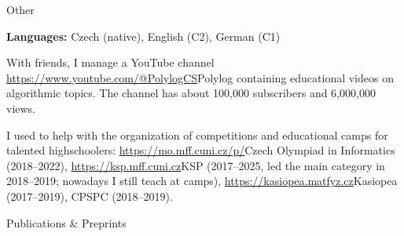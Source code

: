  \iffalse
\sekce Skills
 
{\bf Programming languages:} {\af advanced:} {\B Python}, {\B \Cpp}, {\B C}, {\B sh}; {\af intermediate:} {\B Rust}; {\af basic:} \Cis{}, Haskell.

\smallskip

{\bf Technologies:} {\af Git}, {\af NumPy}, {\af PyTorch}, {\af TensorFlow},
{\af Pandas}, {\af GoogleTest}, {\af GDB}, {\af Make}. Long-time ($> 10$ years) Linux user
with sysadmin and {\bf systems programming} experience.

\smallskip

I also try to broaden my scope by taking {\bf courses in related areas}. So
far, I have taken, for example: Computer Linguistics, Deep Learning, Computer Graphics, Data
Compression Algorithms, Reliable and Trustworthy AI, Information Theory,
Principles of Distributed Computing.

\smallskip


{\bf Languages}: Czech (native), English (C2 -- CAE Grade A), German (B2–C1), French (basics)

\fi

\iffalse
\sekce Teaching

\itemindent=.5\itemindent
\itemnarrow=0pt
\list{-}
	\: Programming I/II practicals for advanced students (), co-taught with Martin Mareš
	\: Programming I practicals for advanced students (), co-taught with Martin Mareš
\endlist

\fi

\sekce Other

{\bf Languages:} Czech (native), English (C2), German (C1)%

With friends, I manage a YouTube channel \url{https://www.youtube.com/@PolylogCS}{Polylog} containing educational videos on algorithmic topics. The channel has about 100,000 subscribers and 6,000,000 views.

I used to help with the organization of competitions and educational camps for talented highschoolers: \url{https://mo.mff.cuni.cz/p/}{Czech Olympiad in Informatics} (2018--2022), \url{https://ksp.mff.cuni.cz}{KSP} (2017–2025, led the main category in 2018–2019; nowadays I still teach at camps), \url{https://kasiopea.matfyz.cz}{Kasiopea} (2017--2019), CPSPC (2018--2019).

%
%

\sekce Publications \& Preprints

\unskip
\nocite{smooth-sensitivity}%
\nocite{dp-mst}%
\nocite{supi-thesis}%
\nocite{supi}%
\nocite{bidijkstra}%
\nocite{sssp}%
\nocite{hladik-bp}%
\nocite{hladik2020complexity}%
%
%

\bye
